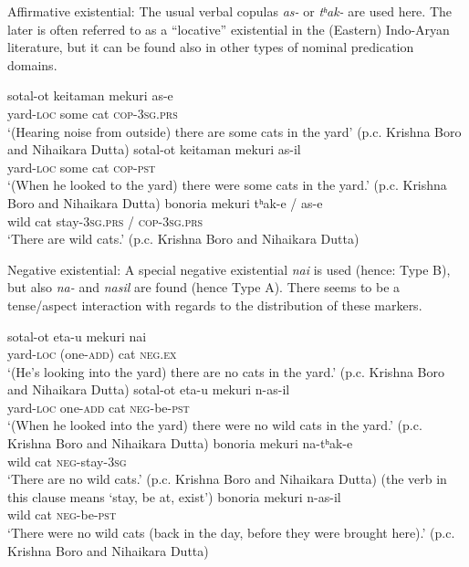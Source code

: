﻿\documentclass[output=paper]{langsci/langscibook}
\begin{document}
\begin{unindented}
Affirmative existential: The usual verbal copulas \textit{as-} or \textit{tʰak-} are used here. The later is often referred to as a “locative” existential in the (Eastern) Indo-Aryan literature, but it can be found also in other types of nominal predication domains.
%
\begin{exe}\ex \gll sotal-ot keitaman mekuri as-e \\
yard-\textsc{loc}  some cat \textsc{cop-3sg.prs} \\
    \glt `(Hearing noise from outside) there are some cats in the yard' (p.c. Krishna Boro and Nihaikara Dutta)
\ex \gll sotal-ot keitaman mekuri as-il \\
yard-\textsc{loc} some cat \textsc{cop-pst} \\
    \glt `(When he looked to the yard) there were some cats in the yard.' (p.c. Krishna Boro and Nihaikara Dutta)
\ex \gll bonoria mekuri tʰak-e / as-e \\
wild cat stay-\textsc{3sg.prs} / \textsc{cop-3sg.prs} \\
    \glt `There are wild cats.' (p.c. Krishna Boro and Nihaikara Dutta)
    \end{exe}

Negative existential: A special negative existential \textit{nai} is used
(hence: Type B), but also \textit{na-} and \textit{nasil} are found (hence
Type A). There seems to be a tense\slash aspect interaction with regards to the distribution of these markers.
%
\begin{exe}\ex \gll sotal-ot {\op}eta-u{\cp} mekuri nai \\
yard-\textsc{loc} (one-\textsc{add}) cat \textsc{neg.ex} \\
    \glt `(He's looking into the yard) there are no cats in the yard.' (p.c. Krishna Boro and Nihaikara Dutta)
\ex \gll sotal-ot {\op}eta-u{\cp} mekuri  n-as-il \\
yard-\textsc{loc} one-\textsc{add} cat \textsc{neg}-be-\textsc{pst} \\
    \glt `(When he looked into the yard) there were no wild cats in the yard.' (p.c. Krishna Boro and Nihaikara Dutta)
\ex \gll bonoria mekuri na-tʰak-e \\
wild cat \textsc{neg}-stay-\textsc{3sg} \\
    \glt `There are no wild cats.' (p.c. Krishna Boro and Nihaikara Dutta) (the verb in this clause means `stay, be at, exist')
\ex \gll bonoria mekuri n-as-il \\
wild cat \textsc{neg}-be-\textsc{pst} \\
    \glt `There were no wild cats (back in the day, before they were brought here).' (p.c. Krishna Boro and Nihaikara Dutta)
    \end{exe}


\end{unindented}
\end{document}
